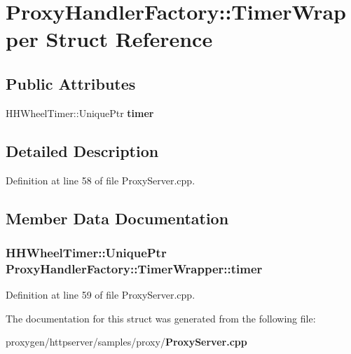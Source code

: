 \section{Proxy\+Handler\+Factory\+:\+:Timer\+Wrapper Struct Reference}
\label{structProxyHandlerFactory_1_1TimerWrapper}
\subsection*{Public Attributes}
\begin{DoxyCompactItemize}
\item 
H\+H\+Wheel\+Timer\+::\+Unique\+Ptr {\bf timer}
\end{DoxyCompactItemize}


\subsection{Detailed Description}


Definition at line 58 of file Proxy\+Server.\+cpp.



\subsection{Member Data Documentation}
\subsubsection[{timer}]{\setlength{\rightskip}{0pt plus 5cm}H\+H\+Wheel\+Timer\+::\+Unique\+Ptr Proxy\+Handler\+Factory\+::\+Timer\+Wrapper\+::timer}\label{structProxyHandlerFactory_1_1TimerWrapper_a0cc7f2d009d1613abda56423301ca4fd}


Definition at line 59 of file Proxy\+Server.\+cpp.



The documentation for this struct was generated from the following file\+:\begin{DoxyCompactItemize}
\item 
proxygen/httpserver/samples/proxy/{\bf Proxy\+Server.\+cpp}\end{DoxyCompactItemize}
